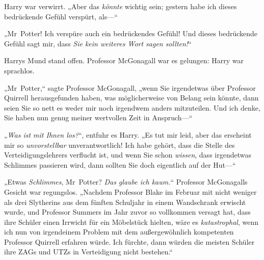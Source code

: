 Harry war verwirrt. „Aber das \emph{könnte} wichtig sein; gestern habe ich dieses bedrückende Gefühl verspürt, als—“

„Mr~Potter! Ich verspüre auch ein bedrückendes Gefühl! Und dieses bedrückende Gefühl sagt mir, dass \emph{Sie kein weiteres Wort sagen sollten!}“

Harrys Mund stand offen. Professor McGonagall war es gelungen: Harry war sprachlos.

„Mr~Potter,“ sagte Professor McGonagall, „wenn Sie irgendetwas über Professor Quirrell herausgefunden haben, was möglicherweise von Belang sein könnte, dann seien Sie so nett es weder mir noch irgendwem anders mitzuteilen. Und ich denke, Sie haben nun genug meiner wertvollen Zeit in Anspruch—“

„\emph{Was ist mit Ihnen los?}“, entfuhr es Harry. „Es tut mir leid, aber das erscheint mir so \emph{unvorstellbar} unverantwortlich! Ich habe gehört, dass die Stelle des Verteidigungslehrers verflucht ist, und wenn Sie schon \emph{wissen}, dass irgendetwas Schlimmes passieren wird, dann sollten Sie doch eigentlich auf der Hut—“

„Etwas \emph{Schlimmes}, Mr~Potter? \emph{Das glaube ich kaum.}“ Professor McGonagalls Gesicht war regungslos. „Nachdem Professor Blake im Februar mit nicht weniger als drei Slytherins aus dem fünften Schuljahr in einem Wandschrank erwischt wurde, und Professor Summers im Jahr zuvor so vollkommen versagt hat, dass ihre Schüler einen Irrwicht für ein Möbelstück hielten, wäre es \emph{katastrophal}, wenn ich nun von irgendeinem Problem mit dem außergewöhnlich kompetenten Professor Quirrell erfahren würde. Ich fürchte, dann würden die meisten Schüler ihre ZAGs und UTZs in Verteidigung nicht bestehen.“

